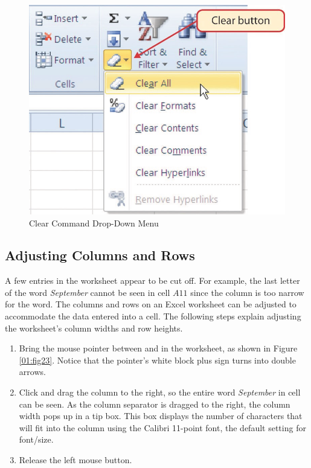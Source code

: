 \begin{figure}[H]
	\centering
	\includegraphics[width=\maxwidth{.95\linewidth}]{gfx/ch01_fig22}
	\caption{Clear Command Drop-Down Menu}
	\label{01:fig22}
\end{figure}

\subsection{Adjusting Columns and Rows}

A few entries in the worksheet appear to be cut off. For example, the last letter of the word \textit{September} cannot be seen in cell $ A11 $ since the column is too narrow for the word. The columns and rows on an Excel worksheet can be adjusted to accommodate the data entered into a cell. The following steps explain adjusting the worksheet's column widths and row heights.

\begin{enumbox}
	\begin{enumerate}
		\item Bring the mouse pointer between  and  in the  worksheet, as shown in Figure \ref{01:fig23}. Notice that the pointer's white block plus sign turns into double arrows.
		\item Click and drag the column to the right, so the entire word \textit{September} in cell  can be seen. As the column separator is dragged to the right, the column width pops up in a tip box. This box displays the number of characters that will fit into the column using the Calibri 11-point font, the default setting for font/size.
		\item Release the left mouse button.
	\end{enumerate}
\end{enumbox}
	

